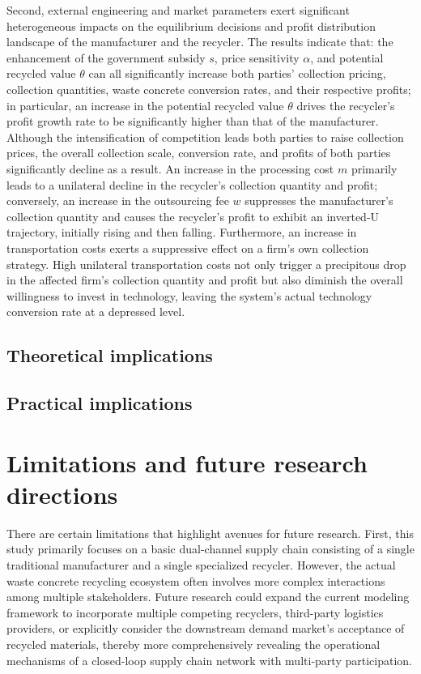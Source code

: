 \documentclass[authoryear,preprint,review,times,10pt]{elsarticle}
\begin{document}
Second, external engineering and market parameters exert significant heterogeneous impacts on the equilibrium decisions and profit distribution landscape of the manufacturer and the recycler. The results indicate that: the enhancement of the government subsidy $s$, price sensitivity $\alpha$, and potential recycled value $\theta$ can all significantly increase both parties' collection pricing, collection quantities, waste concrete conversion rates, and their respective profits; in particular, an increase in the potential recycled value $\theta$ drives the recycler's profit growth rate to be significantly higher than that of the manufacturer. Although the intensification of competition leads both parties to raise collection prices, the overall collection scale, conversion rate, and profits of both parties significantly decline as a result. An increase in the processing cost $m$ primarily leads to a unilateral decline in the recycler's collection quantity and profit; conversely, an increase in the outsourcing fee $w$ suppresses the manufacturer's collection quantity and causes the recycler's profit to exhibit an inverted-U trajectory, initially rising and then falling. Furthermore, an increase in transportation costs exerts a suppressive effect on a firm's own collection strategy. High unilateral transportation costs not only trigger a precipitous drop in the affected firm's collection quantity and profit but also diminish the overall willingness to invest in technology, leaving the system's actual technology conversion rate at a depressed level.

\subsection{Theoretical implications}


\subsection{Practical implications}


\section{Limitations and future research directions}
There are certain limitations that highlight avenues for future research. First, this study primarily focuses on a basic dual-channel supply chain consisting of a single traditional manufacturer and a single specialized recycler. However, the actual waste concrete recycling ecosystem often involves more complex interactions among multiple stakeholders. Future research could expand the current modeling framework to incorporate multiple competing recyclers, third-party logistics providers, or explicitly consider the downstream demand market's acceptance of recycled materials, thereby more comprehensively revealing the operational mechanisms of a closed-loop supply chain network with multi-party participation.
\end{document}
